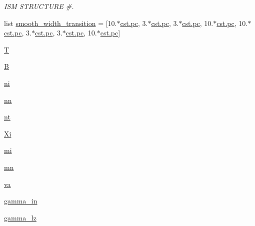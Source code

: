 \begin{DoxyCompactItemize}
\begin{DoxyCompactList}\small\item\em I\+SM S\+T\+R\+U\+C\+T\+U\+RE \#. \end{DoxyCompactList}\item 
list \hyperlink{namespacenamelist_a9c546acac0e1c573855acc22112a8909}{smooth\+\_\+width\+\_\+transition} = \mbox{[}10.$\ast$\hyperlink{constants_8h_a2884cd030c4c825754349a525a1d06ce}{cst.\+pc}, 3.$\ast$\hyperlink{constants_8h_a2884cd030c4c825754349a525a1d06ce}{cst.\+pc}, 3.$\ast$\hyperlink{constants_8h_a2884cd030c4c825754349a525a1d06ce}{cst.\+pc}, 10.$\ast$\hyperlink{constants_8h_a2884cd030c4c825754349a525a1d06ce}{cst.\+pc}, 10.$\ast$\hyperlink{constants_8h_a2884cd030c4c825754349a525a1d06ce}{cst.\+pc}, 3.$\ast$\hyperlink{constants_8h_a2884cd030c4c825754349a525a1d06ce}{cst.\+pc}, 3.$\ast$\hyperlink{constants_8h_a2884cd030c4c825754349a525a1d06ce}{cst.\+pc}, 10.$\ast$\hyperlink{constants_8h_a2884cd030c4c825754349a525a1d06ce}{cst.\+pc}\mbox{]}
\item 
\hyperlink{namespacenamelist_acc085fb18af4161be26b359a7e389498}{T}
\item 
\hyperlink{namespacenamelist_a48ab86f6cb5d4c6de82427283c61ed93}{B}
\item 
\hyperlink{namespacenamelist_a6628cb083819caf50214d44e23ad964c}{ni}
\item 
\hyperlink{namespacenamelist_a4294f2624df5d3000084ae4161a8724f}{nn}
\item 
\hyperlink{namespacenamelist_afa8313c950e0dfdd49787f0fe279e6da}{nt}
\item 
\hyperlink{namespacenamelist_a3cf16c58d15de0a13f6ef0e3e40980a1}{Xi}
\item 
\hyperlink{namespacenamelist_a9e965a35b0fa0cff87b107001d5c7701}{mi}
\item 
\hyperlink{namespacenamelist_ae4897dd96ab17fb714286ebea56954a4}{mn}
\item 
\hyperlink{namespacenamelist_a846209f02cb16bb8cd9701290aeb9829}{va}
\item 
\hyperlink{namespacenamelist_a698275988d17c90a7d6c00f8143021cf}{gamma\+\_\+in}
\item 
\hyperlink{namespacenamelist_a44bbefa452cfa3aa7ee4578357244e9c}{gamma\+\_\+lz}
\item 

\end{DoxyCompactItemize}
